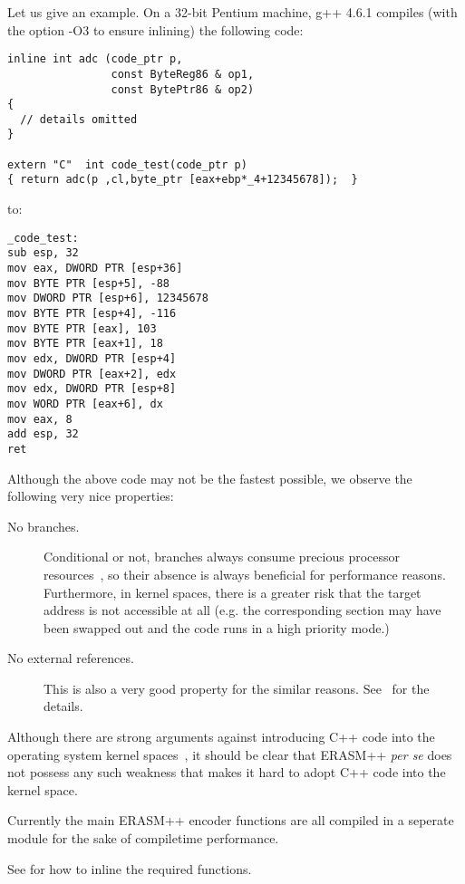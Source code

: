\documentclass{article}
\begin{document}
Let us give an example. On a 32-bit Pentium machine, g++ 4.6.1 compiles
(with the option -O3 to ensure inlining) the following code:

\begin{lstlisting}[frame=single]
inline int adc (code_ptr p, 
                const ByteReg86 & op1,
                const BytePtr86 & op2)
{
  // details omitted
}

extern "C"  int code_test(code_ptr p)
{ return adc(p ,cl,byte_ptr [eax+ebp*_4+12345678]);  }
\end{lstlisting}
to:
\begin{lstlisting}[language={[x86masm]Assembler},frame=single]
_code_test:
sub	esp, 32
mov	eax, DWORD PTR [esp+36]
mov	BYTE PTR [esp+5], -88
mov	DWORD PTR [esp+6], 12345678
mov	BYTE PTR [esp+4], -116
mov	BYTE PTR [eax], 103
mov	BYTE PTR [eax+1], 18
mov	edx, DWORD PTR [esp+4]
mov	DWORD PTR [eax+2], edx
mov	edx, DWORD PTR [esp+8]
mov	WORD PTR [eax+6], dx
mov	eax, 8
add	esp, 32
ret
\end{lstlisting}

Although the above code may not be the fastest possible, we observe the
following very nice properties:

\begin{description}
\item[No branches.] Conditional or not, branches always consume
  precious processor resources~\cite{intel:opt_ref}, so their absence
  is always beneficial for performance reasons. Furthermore, in kernel
  spaces, there is a greater risk that the target address is not
  accessible at all (e.g. the corresponding section may have been
  swapped out and the code runs in a high priority mode.)

\item[No external references.] This is also a very good property for
  the similar reasons. See~\cite{intel:opt_ref} for the details.

\end{description}

Although there are strong arguments against introducing C++ code
into the operating system kernel
spaces~\cite{linux:cpp_kernel}\cite{ms:cpp_kernel}, it should be clear
that ERASM++ \textit{per se} does not possess any such weakness that
makes it hard to adopt C++ code into the kernel space.

Currently the main ERASM++ encoder functions are all compiled in a
seperate module for the sake of compile\-time performance. 

See  for how to inline the required
functions.
\end{document}
